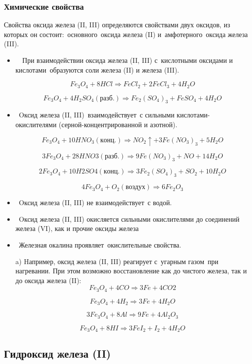 \documentclass[11pt]{article}
\begin{document}
\subsubsection{Химические свойства}
Свойства оксида железа (II, III) определяются свойствами двух оксидов, из
которых он состоит: основного оксида железа (II) и амфотерного оксида железа
(III).
\begin{itemize}
\item  При взаимодействии оксида железа (II, III) с кислотными оксидами и
кислотами образуются соли железа (II) и железа (III).

$$Fe _3 O_4   +  8HCl  \Rightarrow   FeCl _2   +  2FeCl _3   +  4H _2 O$$

$$Fe _3 O_4    +  4H _2 SO _4(разб.)  \Rightarrow Fe _2 (SO _4 ) _3   +  FeSO _4   +  4H_2 O$$
\item Oксид железа (II, III) взаимодействует с сильными кислотами-окислителями
(серной-концентрированной и азотной).

$$Fe _3 O_4   +  10HNO _3(конц.) \Rightarrow NO _2 \uparrow  +  3Fe(NO _3 ) _3   +  5H _2 O$$

$$3Fe _3 O_4    +  28HNO 3(разб.) \Rightarrow9Fe(NO _3 ) _3    +   NO   +  14H _2 O$$

$$2Fe _3 O_4    +  10H 2 SO 4(конц.)  \Rightarrow3Fe _2 (SO _4 ) _3   +  SO _2    +   10H _2 O$$

$$4Fe _3 O_4   +  O _2(воздух)   \Rightarrow  6Fe _2 O _3$$

\item Oксид железа (II, III) не взаимодействует с водой.
\item Oксид железа (II, III) окисляется сильными окислителями до соединений
железа (VI), как и прочие оксиды железа
\item Железная окалина проявляет окислительные свойства.

a) Hапример, оксид железа (II, III) реагирует с угарным газом при нагревании.
При этом возможно восстановление как до чистого железа, так и до оксида
железа (II):
$$Fe _3 O_4   +  4CO  \Rightarrow  3Fe  +  4CO 2$$

$$Fe _3 O_4    +  4H _2   \Rightarrow  3Fe   +   4H _2 O$$

$$3Fe _3 O_4   +  8Al  \Rightarrow  9Fe  +  4Al _2 O _3$$

$$Fe _3 O_4   +  8HI  \Rightarrow  3FeI _2   +  I _2   +  4H _2 O$$
\end{itemize}

\subsection{Гидроксид железа (II)}
\end{document}
